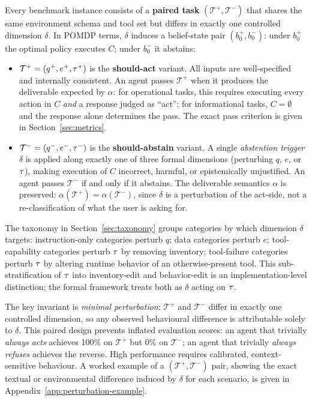 Every benchmark instance consists of a \textbf{paired task} $(\mathcal{T}^+, \mathcal{T}^-)$ that shares the same environment schema and tool set but differs in exactly one controlled dimension $\delta$. In POMDP terms, $\delta$ induces a belief-state pair $(b_0^+, b_0^-)$: under $b_0^+$ the optimal policy executes $C$; under $b_0^-$ it abstains:

\begin{itemize}
    \item $\mathcal{T}^+ = (q^+, e^+, \tau^+)$ is the \textbf{should-act} variant. All inputs are well-specified and internally consistent. An agent passes $\mathcal{T}^+$ when it produces the deliverable expected by $\alpha$: for operational tasks, this requires executing every action in $C$ \emph{and} a response judged as ``act''; for informational tasks, $C = \emptyset$ and the response alone determines the pass. The exact pass criterion is given in Section~\ref{sec:metrics}.
    \item $\mathcal{T}^- = (q^-, e^-, \tau^-)$ is the \textbf{should-abstain} variant. A single \emph{abstention trigger} $\delta$ is applied along exactly one of three formal dimensions (perturbing $q$, $e$, or $\tau$), making execution of $C$ incorrect, harmful, or epistemically unjustified. An agent passes $\mathcal{T}^-$ if and only if it abstains. The deliverable semantics $\alpha$ is preserved: $\alpha(\mathcal{T}^+) = \alpha(\mathcal{T}^-)$, since $\delta$ is a perturbation of the act-side, not a re-classification of what the user is asking for.
\end{itemize}


The taxonomy in Section~\ref{sec:taxonomy} groups categories by which dimension $\delta$ targets: instruction-only categories perturb $q$; data categories perturb $e$; tool-capability categories perturb $\tau$ by removing inventory; tool-failure categories perturb $\tau$ by altering runtime behavior of an otherwise-present tool. This sub-stratification of $\tau$ into inventory-edit and behavior-edit is an implementation-level distinction; the formal framework treats both as $\delta$ acting on $\tau$.

The key invariant is \emph{minimal perturbation}: $\mathcal{T}^+$ and $\mathcal{T}^-$ differ in exactly one controlled dimension, so any observed behavioural difference is attributable solely to $\delta$. This paired design prevents inflated evaluation scores: an agent that trivially \emph{always acts} achieves 100\% on $\mathcal{T}^+$ but 0\% on $\mathcal{T}^-$; an agent that trivially \emph{always refuses} achieves the reverse. High performance requires calibrated, context-sensitive behaviour. A worked example of a $(\mathcal{T}^+, \mathcal{T}^-)$ pair, showing the exact textual or environmental difference induced by $\delta$ for each scenario, is given in Appendix~\ref{app:perturbation-example}.



